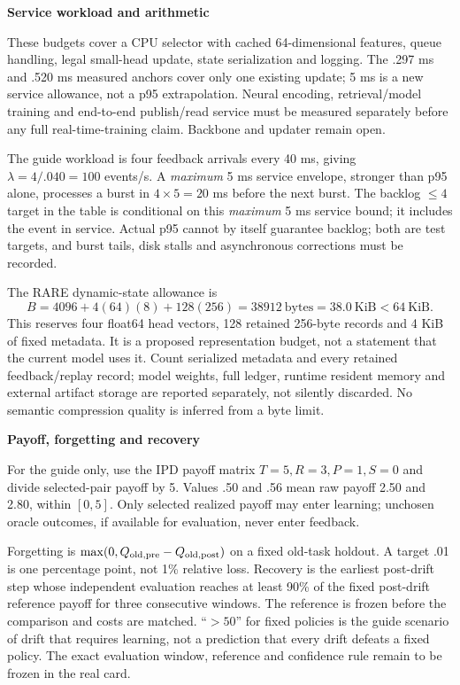 \documentclass[10pt,a4paper]{article}
\newcommand{\lead}[1]{\vspace{4pt}\textbf{#1}\par}
\begin{document}
\lead{Service workload and arithmetic}
These budgets cover a CPU selector with cached 64-dimensional features, queue
handling, legal small-head update, state serialization and logging. The .297 ms
and .520 ms measured anchors cover only one existing update; 5 ms is a new
service allowance, not a p95 extrapolation. Neural encoding, retrieval/model
training and end-to-end publish/read service must be measured separately before
any full real-time-training claim. Backbone and updater remain open.

The guide workload is four feedback arrivals every 40 ms, giving
$\lambda=4/.040=100$ events/s. A \emph{maximum} 5 ms service envelope, stronger
than p95 alone, processes a burst in $4\times5=20$ ms before the next burst.
The backlog $\leq4$ target in the table is conditional on this \emph{maximum}
5 ms service bound; it includes the event in service. Actual p95 cannot by
itself guarantee backlog; both are test targets,
and burst tails, disk stalls and asynchronous corrections must be recorded.

The RARE dynamic-state allowance is
\[
 B=4096+4(64)(8)+128(256)=38912\ \text{bytes}=38.0\ \text{KiB}<64\ \text{KiB}.
\]
This reserves four float64 head vectors, 128 retained 256-byte records and
4 KiB of fixed metadata. It is a proposed representation budget, not a statement
that the current model uses it. Count serialized metadata and every retained
feedback/replay record; model weights, full ledger, runtime resident memory and
external artifact storage are reported separately, not silently discarded.
No semantic compression quality is inferred from a byte limit.

\lead{Payoff, forgetting and recovery}
For the guide only, use the IPD payoff matrix $T=5,R=3,P=1,S=0$ and divide
selected-pair payoff by 5. Values .50 and .56 mean raw payoff 2.50 and 2.80,
within $[0,5]$. Only selected realized payoff may enter learning; unchosen
oracle outcomes, if available for evaluation, never enter feedback.

Forgetting is $\max(0,Q_{\rm old,pre}-Q_{\rm old,post})$ on a fixed old-task
holdout. A target .01 is one percentage point, not 1\% relative loss. Recovery
is the earliest post-drift step whose independent evaluation reaches at least
90\% of the fixed post-drift reference payoff for three consecutive windows.
The reference is frozen before the comparison and costs are matched. ``$>50$''
for fixed policies is the guide scenario of drift that requires learning,
not a prediction that every drift defeats a fixed policy. The exact evaluation
window, reference and confidence rule remain to be frozen in the real card.
\end{document}
